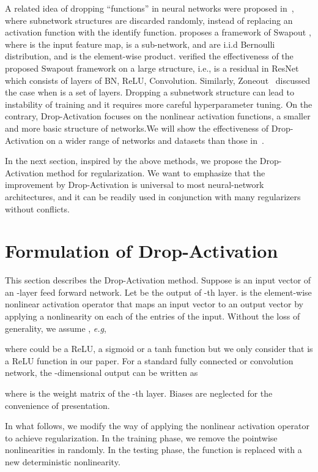 \documentclass[11pt]{article}
\def\eg{\emph{e.g}}
\begin{document}
A related idea of dropping ``functions'' in neural networks were proposed in~\cite{swapout, zoneout}, where subnetwork structures are discarded randomly, instead of replacing an activation function with the identify function. \cite{swapout} proposes a framework of Swapout , where  is the input feature map,  is a sub-network,  and  are i.i.d Bernoulli distribution, and  is the element-wise product. \cite{swapout} verified the effectiveness of the proposed Swapout framework on a large structure, i.e.,  is a residual in ResNet~\cite{resnet} which consists of layers of BN, ReLU, Convolution. Similarly, Zoneout~\cite{zoneout} discussed the case when  is a set of layers. Dropping a subnetwork structure can lead to instability of training and it requires more careful hyperparameter tuning. On the contrary, Drop-Activation focuses on the nonlinear activation functions, a smaller and more basic structure of networks.We will show the effectiveness of Drop-Activation on a wider range of networks and datasets than those in~\cite{swapout, zoneout}.

In the next section, inspired by the above methods, we propose the Drop-Activation method for regularization. We want to emphasize that the improvement by Drop-Activation is universal to most neural-network architectures, and it can be readily used in conjunction with many regularizers without conflicts.

\section{Formulation of Drop-Activation}
\label{sec:3}
This section describes the Drop-Activation method. Suppose  is an input vector of an -layer feed forward network. Let  be the output of -th layer.  is the element-wise nonlinear activation operator that maps an input vector to an output vector by applying a nonlinearity on each of the entries of the input. Without the loss of generality, we assume , \eg,

where  could be a ReLU, a sigmoid or a tanh function but we only consider that  is a ReLU function in our paper. For a standard fully connected or convolution network, the -dimensional output can be written as

where  is the weight matrix of the -th layer. Biases are neglected for the convenience of presentation.

In what follows, we modify the way of applying the nonlinear activation operator  to achieve regularization.
In the training phase, we remove the pointwise nonlinearities in  randomly. In the testing phase, the function  is replaced with a new deterministic nonlinearity.
\end{document}
